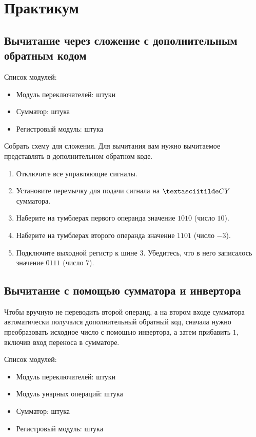 \section{Практикум}

\subsection{Вычитание через сложение с дополнительным обратным кодом}

Список модулей:
\begin{itemize}
    \item Модуль переключателей:  штуки
    \item Сумматор:  штука
    \item Регистровый модуль:  штука
\end{itemize}

Собрать схему для сложения.
Для вычитания вам нужно вычитаемое представлять в дополнительном обратном
коде.

\begin{enumerate}
    \item Отключите все управляющие сигналы.
    \item Установите перемычку для подачи сигнала на $\textasciitilde CY$ сумматора.
    \item Наберите на тумблерах первого операнда значение $1010$ (число $10$).
    \item Наберите на тумблерах второго операнда значение $1101$ (число $-3$).
    \item Подключите выходной регистр к шине $3$. Убедитесь, что в него записалось значение $0111$ (число $7$).
\end{enumerate}

\subsection{Вычитание с помощью сумматора и инвертора}

Чтобы вручную не переводить второй операнд, а на втором входе сумматора автоматически получался дополнительный
обратный код, сначала нужно преобразовать исходное число с помощью инвертора, а затем прибавить $1$,
включив вход переноса в сумматоре.

Список модулей:
\begin{itemize}
    \item Модуль переключателей:  штуки
    \item Модуль унарных операций:  штука
    \item Сумматор:  штука
    \item Регистровый модуль:  штука
\end{itemize}

